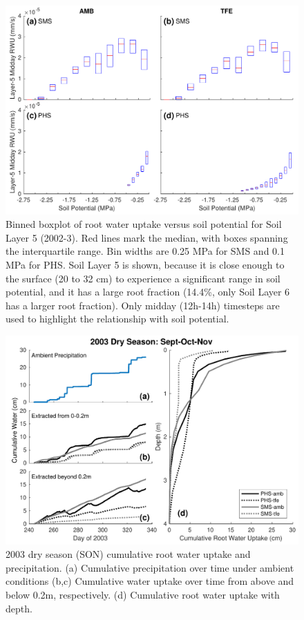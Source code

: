 \documentclass[draft,linenumbers]{agujournal}
\begin{document}
  \begin{figure}[h]
     \centering
     \includegraphics[width=30pc]{../figs3/rwu.pdf}
     \caption{Binned boxplot of root water uptake versus soil potential for Soil Layer 5 (2002-3).
     Red lines mark the median, with boxes spanning the interquartile range.
     Bin widths are 0.25 MPa for SMS and 0.1 MPa for PHS.
     Soil Layer 5 is shown, because it is close enough to the surface (20 to 32 cm) to experience a significant range in soil potential, and it has a large root fraction (14.4\%, only Soil Layer 6 has a larger root fraction).
     Only midday (12h-14h) timesteps are used to highlight the relationship with soil potential.}
     \label{fig:rwu}
  \end{figure}
  \clearpage
  

        \clearpage
    \begin{figure}[h]
     \centering
     \includegraphics[width=30pc]{../figs3/qdry.pdf}
     \caption{2003 dry season (SON) cumulative root water uptake and precipitation. 
     (a) Cumulative precipitation over time under ambient conditions
     (b,c) Cumulative water uptake over time from above and below 0.2m, respectively.
     (d) Cumulative root water uptake with depth.
     }
     \label{fig:qdry}
  \end{figure}
  
\end{document}
